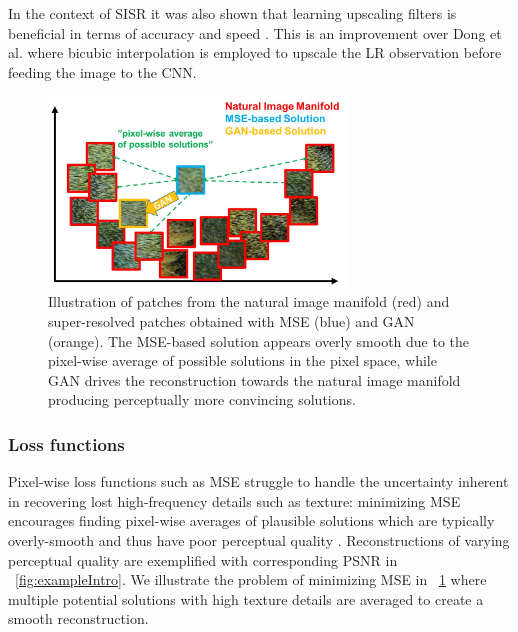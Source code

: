 \documentclass[10pt,twocolumn,letterpaper]{article}
\begin{document}
In the context of \ac{SISR} it was also shown that learning upscaling filters is beneficial in terms of accuracy and speed \cite{dong2016accelerating,Shi2016ESPCN,Wang2016}.
This is an improvement over Dong et al. \cite{dong2016image} where bicubic interpolation is employed to upscale the LR observation before feeding the image to the \ac{CNN}. %

\begin{figure}[ht]
\includegraphics[trim=0 0 0 0, clip, width=3.1in]{images/used/jpg/manifold.jpg}
\caption{Illustration of patches from the natural image manifold (red) and super-resolved patches obtained with MSE (blue) and GAN (orange). The MSE-based solution appears overly smooth due to the pixel-wise average of possible solutions in the pixel space, while GAN drives the reconstruction towards the natural image manifold producing perceptually more convincing solutions.}
\label{fig:manifold}
\end{figure}

\subsubsection{Loss functions}
Pixel-wise loss functions such as \ac{MSE} struggle to handle the uncertainty inherent in recovering lost high-frequency details such as texture: minimizing \ac{MSE} encourages finding pixel-wise averages of plausible solutions which are typically overly-smooth and thus have poor perceptual quality \cite{Mathieu2015, Johnson16PercepLoss, dosovitskiy2016generating, bruna2016super}.
Reconstructions of varying perceptual quality are exemplified with corresponding \ac{PSNR} in \figurename~\ref{fig:exampleIntro}. We illustrate the problem of minimizing \ac{MSE} in \figurename~\ref{fig:manifold} where multiple potential solutions with high texture details are averaged to create a smooth reconstruction.
\end{document}

